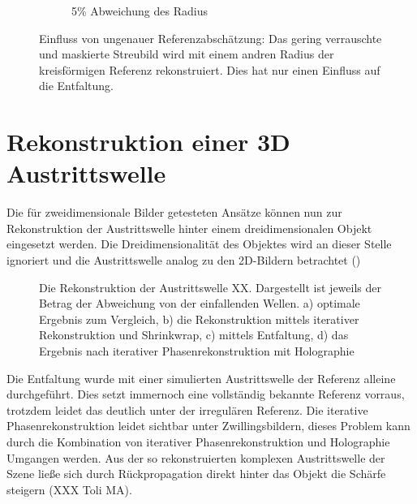 \begin{figure}
\begin{subfigure}[b]{0.45\textwidth}
		\caption{5\% Abweichung des Radius}	
	\end{subfigure}
	\caption[2D Rekonstruktion: Referenz]{Einfluss von ungenauer Referenzabschätzung: Das gering verrauschte und maskierte Streubild wird mit einem andren Radius der kreisförmigen Referenz rekonstruiert. Dies hat nur einen Einfluss auf die Entfaltung.}
\end{figure}
\section{Rekonstruktion einer 3D Austrittswelle}
Die für zweidimensionale Bilder getesteten Ansätze können nun zur Rekonstruktion der Austrittswelle hinter einem dreidimensionalen Objekt eingesetzt werden. Die Dreidimensionalität des Objektes wird an dieser Stelle ignoriert und die Austrittswelle analog zu den 2D-Bildern betrachtet ()

\begin{figure}
	\centering
	\caption[Rekonstruktion einer Austrittswelle]{Die Rekonstruktion der Austrittswelle XX. Dargestellt ist jeweils der Betrag der Abweichung von der einfallenden Wellen. a) optimale Ergebnis zum Vergleich, b) die Rekonstruktion mittels iterativer Rekonstruktion und Shrinkwrap, c) mittels Entfaltung, d) das Ergebnis nach iterativer Phasenrekonstruktion mit Holographie}
	\label{fig:recon3d}
\end{figure}	
Die Entfaltung wurde mit einer simulierten Austrittswelle der Referenz alleine durchgeführt. Dies setzt immernoch eine vollständig bekannte Referenz vorraus, trotzdem leidet das deutlich unter der irregulären Referenz. Die iterative Phasenrekonstruktion leidet sichtbar unter Zwillingsbildern, dieses Problem kann durch die Kombination von iterativer Phasenrekonstruktion und Holographie Umgangen werden. 
Aus der so rekonstruierten komplexen Austrittswelle der Szene ließe sich durch Rückpropagation direkt hinter das Objekt die Schärfe steigern (XXX Toli MA).
